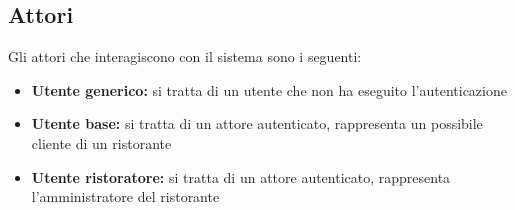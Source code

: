 \subsection{Attori}
Gli attori che interagiscono con il sistema sono i seguenti:
\begin{itemize}
	\item \textbf{Utente generico:} si tratta di un utente che non ha eseguito l'autenticazione
	\item \textbf{Utente base:} si tratta di un attore autenticato, rappresenta un possibile cliente di un ristorante
	\item \textbf{Utente ristoratore:} si tratta di un attore autenticato, rappresenta l'amministratore del ristorante
\end{itemize}
